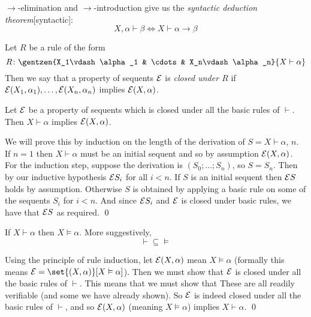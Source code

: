 $\to$-elimination and $\to$-introduction give us the {\it syntactic deduction theorem}[syntactic]:
$$ X,\alpha\vdash\beta \iff X\vdash\alpha\to\beta $$

Let $R$ be a rule of the form
$$ R\colon \gentzen{X_1\vdash\alpha_1 & \cdots & X_n\vdash\alpha_n}{X\vdash\alpha} $$
Then we say that a property of sequents ${\cal E}$ is {\it closed under $R$} if ${\cal E}(X_1,\alpha_1),\dots,{\cal E}(X_n,\alpha_n)$ implies ${\cal E}(X,\alpha)$.

\bprop[title=Principle of Rule Induction, name=ruleinduction]

    Let ${\cal E}$ be a property of sequents which is closed under all the basic rules of $\vdash$.
    Then $X\vdash\alpha$ implies ${\cal E}(X,\alpha)$.

\eprop

We will prove this by induction on the length of the derivation of $S=X\vdash\alpha$, $n$.
If $n=1$ then $X\vdash\alpha$ must be an initial sequent and so by assumption ${\cal E}(X,\alpha)$.
For the induction step, suppose the derivation is $(S_0;\dots;S_n)$, so $S=S_n$.
Then by our inductive hypothesis ${\cal E}S_i$ for all $i<n$.
If $S$ is an initial sequent then ${\cal E}S$ holds by assumption.
Otherwise $S$ is obtained by applying a basic rule on some of the sequents $S_i$ for $i<n$.
And since ${\cal E}S_i$ and ${\cal E}$ is closed under basic rules, we have that ${\cal E}S$ as required.
\qed

\blemm[title=Soundness of $\vdash$]

    If $X\vdash\alpha$ then $X\vDash\alpha$.
    More suggestively,
    $$ {\vdash}\subseteq{\vDash} $$

\elemm

Using the principle of rule induction, let ${\cal E}(X,\alpha)$ mean $X\vDash\alpha$ (formally this means ${\cal E}=\set{(X,\alpha)}[X\vDash\alpha]$).
Then we must show that ${\cal E}$ is closed under all the basic rules of $\vdash$.
This means that we must show that
These are all readily verifiable (and some we have already shown).
So ${\cal E}$ is indeed closed under all the basic rules of $\vdash$, and so ${\cal E}(X,\alpha)$ (meaning $X\vDash\alpha$) implies $X\vdash\alpha$.
\qed

